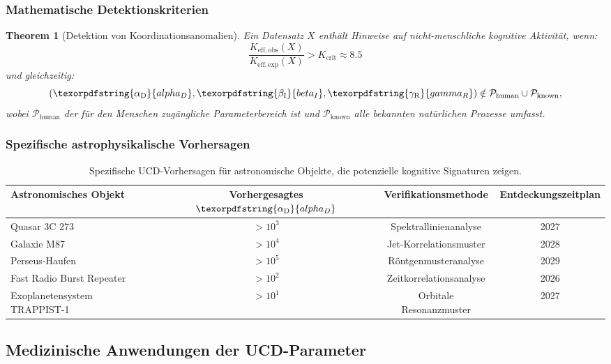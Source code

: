 \documentclass[12pt,a4paper]{article}
\newtheorem{theorem}{Theorem}
\DeclareRobustCommand{\alD}{\texorpdfstring{\ensuremath{\alpha_{\mathrm{D}}}}{alpha_D}}
\DeclareRobustCommand{\beI}{\texorpdfstring{\ensuremath{\beta_{\mathrm{I}}}}{beta_I}}
\DeclareRobustCommand{\gaR}{\texorpdfstring{\ensuremath{\gamma_{\mathrm{R}}}}{gamma_R}}
\newcommand{\eff}{\mathrm{eff}}
\newcommand{\Keobs}{K_{\eff,\mathrm{obs}}}
\newcommand{\Keexp}{K_{\eff,\mathrm{exp}}}
\newcommand{\Kcrit}{K_{\mathrm{crit}}}
\begin{document}
	\subsubsection{Mathematische Detektionskriterien}
	
	\begin{theorem}[Detektion von Koordinationsanomalien]
		Ein Datensatz \(X\) enthält Hinweise auf nicht-menschliche kognitive Aktivität, wenn:
		\[
		\frac{\Keobs(X)}{\Keexp(X)} > \Kcrit \approx 8.5
		\]
		und gleichzeitig:
		\[
		(\alD, \beI, \gaR) \notin \mathcal{P}_{\mathrm{human}} \cup \mathcal{P}_{\mathrm{known}},
		\]
		wobei \(\mathcal{P}_{\mathrm{human}}\) der für den Menschen zugängliche Parameterbereich ist und \(\mathcal{P}_{\mathrm{known}}\) alle bekannten natürlichen Prozesse umfasst.
	\end{theorem}
	
	\subsubsection{Spezifische astrophysikalische Vorhersagen}
	
	\begin{table}[ht]
		\centering
		\begin{tabular}{lccc}
			\toprule
			\textbf{Astronomisches Objekt} & \textbf{Vorhergesagtes \(\alD\)} & \textbf{Verifikationsmethode} & \textbf{Entdeckungszeitplan} \\
			\midrule
			Quasar 3C 273 & \(>10^3\) & Spektrallinienanalyse & 2027 \\
			Galaxie M87 & \(>10^4\) & Jet-Korrelationsmuster & 2028 \\
			Perseus-Haufen & \(>10^5\) & Röntgenmusteranalyse & 2029 \\
			Fast Radio Burst Repeater & \(>10^2\) & Zeitkorrelationsanalyse & 2026 \\
			Exoplanetensystem TRAPPIST-1 & \(>10^1\) & Orbitale Resonanzmuster & 2027 \\
			\bottomrule
		\end{tabular}
		\caption{Spezifische UCD-Vorhersagen für astronomische Objekte, die potenzielle kognitive Signaturen zeigen.}
		\label{tab:astro-predictions}
	\end{table}
	
	\subsection{Medizinische Anwendungen der UCD-Parameter}
	
\end{document}
